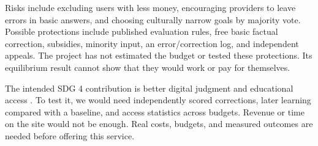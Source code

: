 Risks include excluding users with less money, encouraging providers to leave errors in basic answers, and choosing culturally narrow goals by majority vote. Possible protections include published evaluation rules, free basic factual correction, subsidies, minority input, an error/correction log, and independent appeals. The project has not estimated the budget or tested these protections. Its equilibrium result cannot show that they would work or pay for themselves.

The intended SDG 4 contribution is better digital judgment and educational access \cite{un2026}. To test it, we would need independently scored corrections, later learning compared with a baseline, and access statistics across budgets. Revenue or time on the site would not be enough. Real costs, budgets, and measured outcomes are needed before offering this service.
